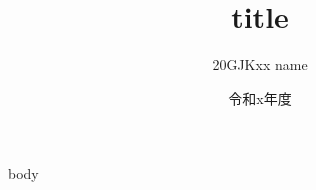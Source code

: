 \documentclass[a4paper,12pt]{ujarticle}
\makeatletter
\def\supervisor#1{\gdef\@supervisor{#1}}
\makeatother
\begin{document}
\date{令和x年度}
\title{title}
\author{20GJKxx name}
\supervisor{下川 俊彦 教授}
\maketitle
\thispagestyle{empty}

body
\end{document}
